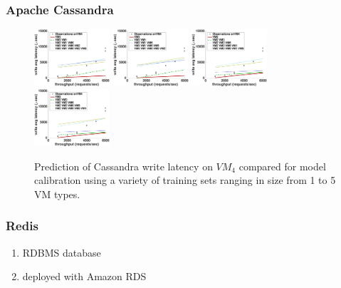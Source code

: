 \documentclass{beamer}
\begin{document}
\begin{frame}
\frametitle{Apache Cassandra}
\begin{figure}
\includegraphics[width=0.25\textwidth]{cassandra_fit_write_avg_latency_m3_2x_m3__r3_2x_m3_x_r3_x_r3_.eps}
\includegraphics[width=0.25\textwidth]{cassandra_fit_write_avg_latency_m3_2x_m3__r3_2x_r3_x_m3_x_r3_.eps}
\includegraphics[width=0.25\textwidth]{cassandra_fit_write_avg_latency_m3_x_m3_2x_r3_2x_m3__r3_x_r3_.eps}
\includegraphics[width=0.25\textwidth]{cassandra_fit_write_avg_latency_m3_x_m3_2x_r3_2x_r3_x_m3__r3_.eps}
\caption{Prediction of Cassandra write latency on $VM_4$ compared for model calibration using a variety of training sets ranging in size from 1 to 5 VM types.}
\end{figure}
\end{frame}

\begin{frame}
\frametitle{Redis}
\begin{enumerate}
\item RDBMS database
\item deployed with Amazon RDS
\end{enumerate}
\end{frame}
\end{document}
